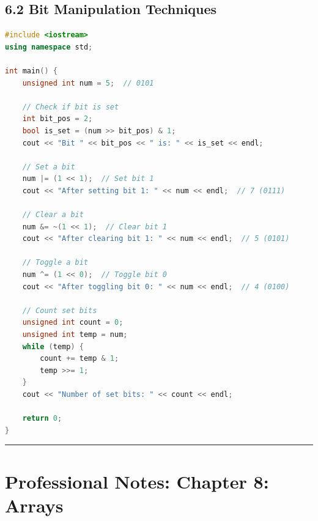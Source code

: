 \hypertarget{bit-manipulation-techniques}{%
\subsection{6.2 Bit Manipulation
Techniques}\label{bit-manipulation-techniques}}

\begin{lstlisting}[language={C++}]
#include <iostream>
using namespace std;

int main() {
    unsigned int num = 5;  // 0101

    // Check if bit is set
    int bit_pos = 2;
    bool is_set = (num >> bit_pos) & 1;
    cout << "Bit " << bit_pos << " is: " << is_set << endl;

    // Set a bit
    num |= (1 << 1);  // Set bit 1
    cout << "After setting bit 1: " << num << endl;  // 7 (0111)

    // Clear a bit
    num &= ~(1 << 1);  // Clear bit 1
    cout << "After clearing bit 1: " << num << endl;  // 5 (0101)

    // Toggle a bit
    num ^= (1 << 0);  // Toggle bit 0
    cout << "After toggling bit 0: " << num << endl;  // 4 (0100)

    // Count set bits
    unsigned int count = 0;
    unsigned int temp = num;
    while (temp) {
        count += temp & 1;
        temp >>= 1;
    }
    cout << "Number of set bits: " << count << endl;

    return 0;
}
\end{lstlisting}

\begin{center}\rule{0.5\linewidth}{0.5pt}\end{center}

\hypertarget{professional-notes-chapter-8-arrays}{%
\section{Professional Notes: Chapter 8:
Arrays}\label{professional-notes-chapter-8-arrays}}

